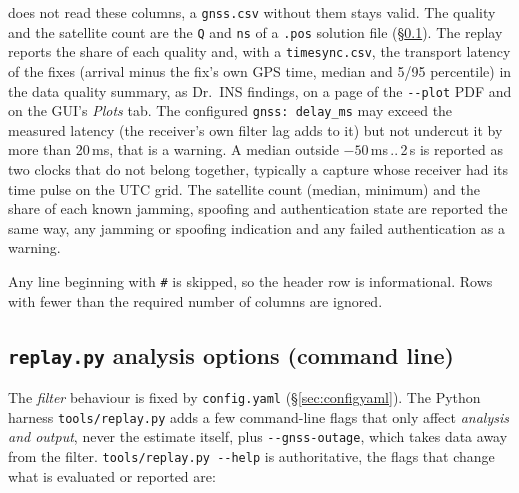 \documentclass[11pt,a4paper]{article}
\newcommand{\code}[1]{\texttt{#1}}
\begin{document}
\begin{description}
    does not read these columns, a \code{gnss.csv} without them stays
    valid. The quality and the satellite count are the \code{Q} and
    \code{ns} of a \code{.pos} solution file (\S\ref{sec:replaycli}).
    The replay reports the share of each quality and, with a
    \code{timesync.csv}, the transport latency of the fixes (arrival
    minus the fix's own GPS time, median and 5/95 percentile) in the data
    quality summary, as Dr.~INS findings, on a page of the
    \code{-{}-plot} PDF and on the GUI's \emph{Plots} tab. The configured
    \code{gnss: delay\_\allowbreak{}ms} may exceed the measured latency
    (the receiver's own filter lag adds to it) but not undercut it by
    more than 20\,ms, that is a warning. A median outside
    $-50$\,ms\,..\,2\,s is reported as two clocks that do not belong
    together, typically a capture whose receiver had its time pulse on
    the UTC grid. The satellite count (median, minimum) and the share of
    each known jamming, spoofing and authentication state are reported
    the same way, any jamming or spoofing indication and any failed
    authentication as a warning.
  \item[Header/comment lines] Any line beginning with \code{\#} is skipped, so
    the header row is informational. Rows with fewer than the required number of
    columns are ignored.
\end{description}

\subsection{\code{replay.py} analysis options (command line)}
\label{sec:replaycli}

The \emph{filter} behaviour is fixed by \code{config.yaml}
(\S\ref{sec:configyaml}). The Python harness \code{tools/replay.py} adds a few
command-line flags that only affect \emph{analysis and output}, never the
estimate itself, plus \code{-{}-gnss-outage}, which takes data away from
the filter. \code{tools/replay.py -{}-help} is authoritative, the flags
that change what is evaluated or reported are:
\end{document}
